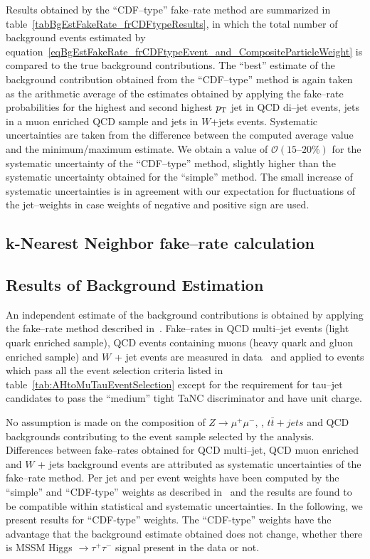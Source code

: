 Results obtained by the ``CDF--type'' fake--rate method are summarized in
table~\ref{tabBgEstFakeRate_frCDFtypeResults}, in which the total number of
background events estimated by
equation~\ref{eqBgEstFakeRate_frCDFtypeEvent_and_CompositeParticleWeight} is
compared to the true background contributions.  The ``best'' estimate of the
background contribution obtained from the ``CDF--type'' method is again taken as
the arithmetic average of the estimates obtained by applying the fake--rate
probabilities for the highest and second highest $p_{\mathrm{T}}$ jet in QCD di--jet
events, jets in a muon enriched QCD sample and jets in $W$+jets events.
Systematic uncertainties are taken from the difference between the computed
average value and the minimum/maximum estimate.  We obtain a value of
$\mathcal{O} \left( 15 \mbox{--} 20 \% \right)$ for the systematic uncertainty
of the ``CDF--type'' method, slightly higher than the systematic uncertainty
obtained for the ``simple'' method.  The small increase of systematic
uncertainties is in agreement with our expectation for fluctuations of the
jet--weights in case weights of negative and positive sign are used.

\subsection{k-Nearest Neighbor fake--rate calculation}

\subsection{Results of Background Estimation}

An independent estimate of the background contributions is obtained by applying
the fake--rate method described in~\cite{CMS_AN_2010-074}.  Fake--rates in QCD
multi--jet events (light quark enriched sample), QCD events containing muons
(heavy quark and gluon enriched sample) and $W$ + jet events are measured in
data~\cite{PFT-10-004,CMS_AN_2010-XXX} and applied to events which pass all the
event selection criteria listed in table~\ref{tab:AHtoMuTauEventSelection}
except for the requirement for tau--jet candidates to pass the ``medium'' tight
TaNC discriminator and have unit charge.

No assumption is made on the composition of $Z \to \mu^{+} \mu^{-}$, \WpJets,
$t\bar{t} + jets$ and QCD backgrounds contributing to the event sample selected
by the analysis.  Differences between fake--rates obtained for QCD multi--jet,
QCD muon enriched and $W$ + jets background events are attributed as systematic
uncertainties of the fake--rate method.  Per jet and per event weights have been
computed by the ``simple'' and ``CDF-type'' weights as described
in~\cite{CMS_AN_2010-074} and the results are found to be compatible within
statistical and systematic uncertainties.  In the following, we present results
for ``CDF-type'' weights.  The ``CDF-type'' weights have the advantage that the
background estimate obtained does not change, whether there is MSSM Higgs $\to
\tau^{+} \tau^{-}$ signal present in the data or not.

